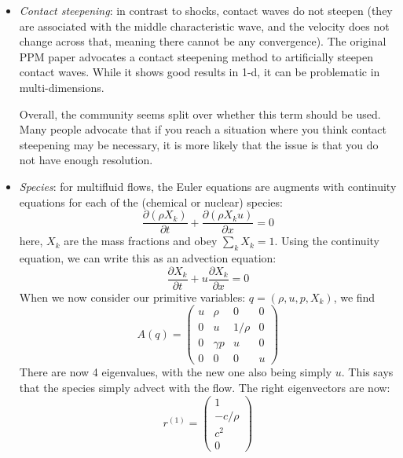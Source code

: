 \begin{itemize}
\item {\em Contact steepening}: in contrast to shocks, contact waves
  do not steepen (they are associated with the middle characteristic
  wave, and the velocity does not change across that, meaning there
  cannot be any convergence).  The original PPM
  paper advocates a contact steepening method to artificially steepen
  contact waves.  While it shows good results in 1-d, it can be
  problematic in multi-dimensions.  

  Overall, the community seems split over whether this term should be
  used.  Many people advocate that if you reach a situation where you
  think contact steepening may be necessary, it is more likely that
  the issue is that you do not have enough resolution.

\item {\em Species}: for multifluid flows, the Euler equations are
augments with continuity equations for each of the (chemical or nuclear)
species:
\begin{equation}
\frac{\partial (\rho X_k)}{\partial t} + \frac{\partial (\rho X_k u)}{\partial x} = 0
\end{equation}
here, $X_k$ are the mass fractions and obey $\sum_k X_k = 1$.  Using the
continuity equation, we can write this as an advection equation:
\begin{equation}
\frac{\partial X_k}{\partial t} + u \frac{\partial X_k}{\partial x} = 0
\end{equation}
When we now consider our primitive variables: $q = (\rho, u, p, X_k)$,
we find
\begin{equation}
A(q) = \left ( \begin{array}{cccc} u  & \rho     & 0      &  0\\
                                  0  &  u       & 1/\rho &  0\\
                                  0  & \gamma p & u      &  0\\
                                  0  & 0        & 0      & u \end{array} \right )
\end{equation}
There are now 4 eigenvalues, with the new one also being simply $u$.
This says that the species simply advect with the flow.  The right
eigenvectors are now:
\begin{equation}
r^{(1)} = \left ( \begin{array}{c} 1 \\ -c/\rho \\ c^2 \\ 0\end{array} \right )

\end{equation}
\end{itemize}
